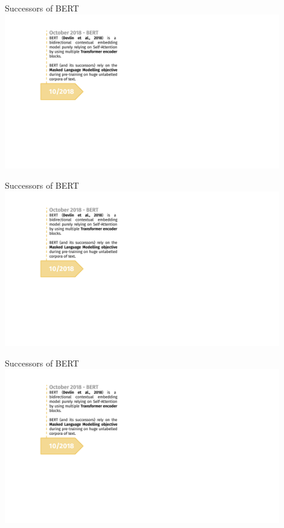 \begin{vbframe}{Successors of BERT}
\hbox{\hspace{-3em} \includegraphics[width=12cm,page=1]{figure/transfer_learning_timeline4_nlp.pdf}}
\end{vbframe}
\begin{vbframe}{Successors of BERT}
\hbox{\hspace{-3em} \includegraphics[width=12cm,page=2]{figure/transfer_learning_timeline4_nlp.pdf}}
\end{vbframe}
\begin{vbframe}{Successors of BERT}
\hbox{\hspace{-3em} \includegraphics[width=12cm,page=3]{figure/transfer_learning_timeline4_nlp.pdf}}
\end{vbframe}
